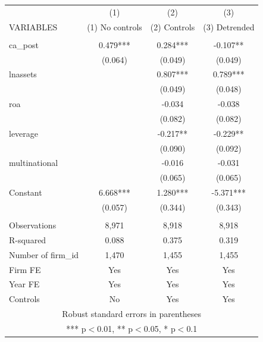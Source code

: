 \begin{tabular}{lccc} \hline
 & (1) & (2) & (3) \\
VARIABLES & (1) No controls & (2) Controls & (3) Detrended \\ \hline
 &  &  &  \\
ca\_post & 0.479*** & 0.284*** & -0.107** \\
 & (0.064) & (0.049) & (0.049) \\
lnassets &  & 0.807*** & 0.789*** \\
 &  & (0.049) & (0.048) \\
roa &  & -0.034 & -0.038 \\
 &  & (0.082) & (0.082) \\
leverage &  & -0.217** & -0.229** \\
 &  & (0.090) & (0.092) \\
multinational &  & -0.016 & -0.031 \\
 &  & (0.065) & (0.065) \\
Constant & 6.668*** & 1.280*** & -5.371*** \\
 & (0.057) & (0.344) & (0.343) \\
 &  &  &  \\
Observations & 8,971 & 8,918 & 8,918 \\
R-squared & 0.088 & 0.375 & 0.319 \\
Number of firm\_id & 1,470 & 1,455 & 1,455 \\
Firm FE & Yes & Yes & Yes \\
Year FE & Yes & Yes & Yes \\
 Controls & No & Yes & Yes \\ \hline
\multicolumn{4}{c}{ Robust standard errors in parentheses} \\
\multicolumn{4}{c}{ *** p$<$0.01, ** p$<$0.05, * p$<$0.1} \\
\end{tabular}

